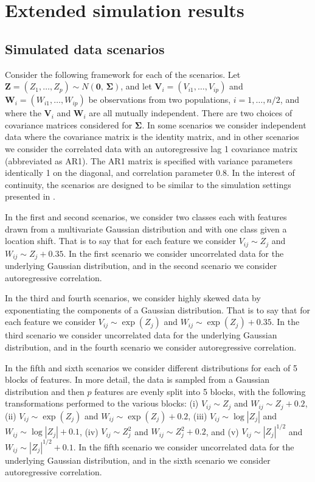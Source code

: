 \documentclass{article}
\renewcommand{\vec}{\bm}
\begin{document}
\section{Extended simulation results}
\label{sec:simulation-results}

\subsection{Simulated data scenarios}
\label{sec:simulated-data-scenarios}

Consider the following framework for each of the scenarios.  Let
$\vec{Z} = (Z_1, \dots, Z_p) \sim N(\vec{0},\, \vec{\Sigma})$, and let
$\vec{V}_i = (V_{i1}, \dots, V_{ip})$ and $\vec{W}_i = (W_{i1}, \dots, W_{ip})$
be observations from two populations, $i = 1, \dots, n / 2$, and where the
$\vec{V}_i$ and $\vec{W}_i$ are all mutually independent.  There are two choices
of covariance matrices considered for $\vec{\Sigma}$.  In some scenarios we
consider independent data where the covariance matrix is the identity matrix,
and in other scenarios we consider the correlated data with an autoregressive
lag 1 covariance matrix (abbreviated as AR1).  The AR1 matrix is specified with
variance parameters identically 1 on the diagonal, and correlation parameter
0.8.  In the interest of continuity, the scenarios are designed to be similar to
the simulation settings presented in \cite{hennig2016}.

In the first and second scenarios, we consider two classes each with features
drawn from a multivariate Gaussian distribution and with one class given a
location shift.  That is to say that for each feature we consider
$V_{ij} \sim Z_j$ and $W_{ij} \sim Z_j + 0.35$.  In the first scenario we
consider uncorrelated data for the underlying Gaussian distribution, and in the
second scenario we consider autoregressive correlation.

In the third and fourth scenarios, we consider highly skewed data by
exponentiating the components of a Gaussian distribution.  That is to say that
for each feature we consider $V_{ij} \sim \exp(Z_j)$ and
$W_{ij} \sim \exp(Z_j) + 0.35$.  In the third scenario we consider uncorrelated
data for the underlying Gaussian distribution, and in the fourth scenario we
consider autoregressive correlation.

In the fifth and sixth scenarios we consider different distributions for each of
5 blocks of features.  In more detail, the data is sampled from a Gaussian
distribution and then $p$ features are evenly split into 5 blocks, with the
following transformations performed to the various blocks: (i) $V_{ij} \sim Z_j$
and $W_{ij} \sim Z_j + 0.2$, (ii) $V_{ij} \sim \exp(Z_j)$ and
$W_{ij} \sim \exp(Z_j) + 0.2$, (iii) $V_{ij} \sim \log |Z_j|$ and
$W_{ij} \sim \log |Z_j| + 0.1$, (iv) $V_{ij} \sim Z_j^2$ and
$W_{ij} \sim Z_j^2 + 0.2$, and (v) $V_{ij} \sim |Z_j|^{1/2}$ and
$W_{ij} \sim |Z_j|^{1/2} + 0.1$.  In the fifth scenario we consider uncorrelated
data for the underlying Gaussian distribution, and in the sixth scenario we
consider autoregressive correlation.
\end{document}
